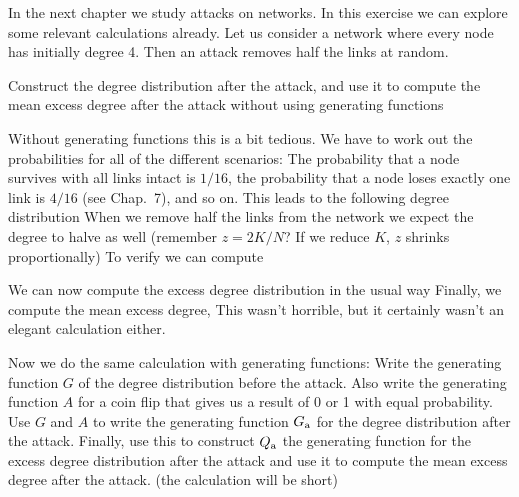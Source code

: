 In the next chapter we study attacks on networks. In this exercise we can explore some relevant calculations already. Let us consider a network where every node has initially degree 4. Then an attack removes half the links at random.  

\subquestion Construct the degree distribution after the attack, and use it to compute the mean excess degree after the attack without using generating functions 

\solution
Without generating functions this is a bit tedious. We have to work out the probabilities for all of the different scenarios: The probability that a node survives with all links intact is $1/16$, the probability that a node loses exactly one link is $4/16$ (see Chap.~7), and so on. This leads to the following degree distribution
When we remove half the links from the network we expect the degree to halve as well (remember $z=2K/N$? If we reduce $K$, $z$ shrinks proportionally) 
To verify we can compute

We can now compute the excess degree distribution in the usual way 
Finally, we compute the mean excess degree,
This wasn't horrible, but it certainly wasn't an elegant calculation either. 

\subquestion Now we do the same calculation with generating functions: Write the generating function $G$ of the degree distribution before the attack. Also write the generating function $A$ for a coin flip that gives us a result of 0 or 1 with equal probability. Use $G$ and $A$ to write the generating function $G_{\rm a}$ for the degree distribution after the attack. Finally, use this to construct $Q_{\rm a}$ the generating function for the excess degree distribution after the attack and use it to compute the mean excess degree after the attack. (the calculation will be short)

